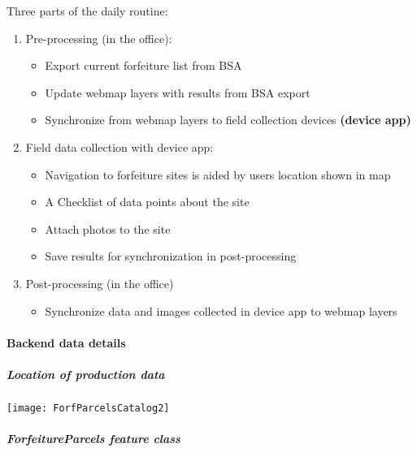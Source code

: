 \documentclass[class=article , crop=false, titlepage, twoside, multi={itemize, figure, verbatim}, float=false]{standalone}
\begin{document}
Three parts of the daily routine:
\begin{enumerate}
\item Pre-processing (in the office):

\begin{itemize}
\item Export current forfeiture list from BSA
\item Update webmap layers with results from BSA export
\item Synchronize from webmap layers to field collection devices \textbf{(device app)}
\end{itemize}

\item Field data collection with device app:

\begin{itemize}
\item Navigation to forfeiture sites is aided by users location shown in map
\item A Checklist of data points about the site
\item Attach photos to the site
\item Save results for synchronization in post-processing
\end{itemize}

\item Post-processing (in the office)

\begin{itemize}
\item Synchronize data and images collected in device app to webmap layers

\end{itemize}
\end{enumerate}

\paragraph{Backend data details}
\subparagraph{Location of production data}

\begin{center}
    \texttt{[image: ForfParcelsCatalog2]}
    \label{img:forfCat1}
\end{center}

\subparagraph{ForfeitureParcels feature class}

\end{document}

